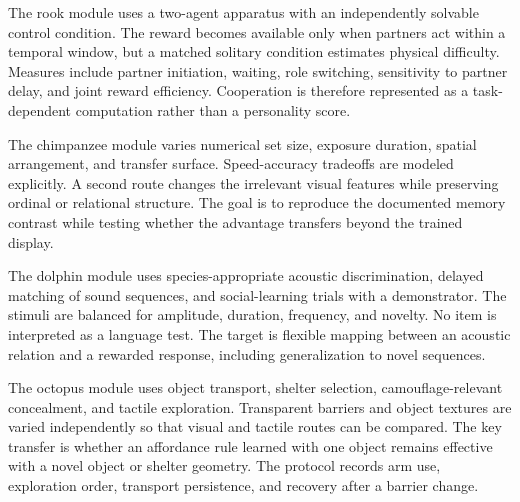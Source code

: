 \documentclass[conference]{IEEEtran}
\begin{document}
The rook module uses a two-agent apparatus with an independently solvable control condition. The reward becomes available only when partners act within a temporal window, but a matched solitary condition estimates physical difficulty. Measures include partner initiation, waiting, role switching, sensitivity to partner delay, and joint reward efficiency. Cooperation is therefore represented as a task-dependent computation rather than a personality score.

The chimpanzee module varies numerical set size, exposure duration, spatial arrangement, and transfer surface. Speed-accuracy tradeoffs are modeled explicitly. A second route changes the irrelevant visual features while preserving ordinal or relational structure. The goal is to reproduce the documented memory contrast while testing whether the advantage transfers beyond the trained display.

The dolphin module uses species-appropriate acoustic discrimination, delayed matching of sound sequences, and social-learning trials with a demonstrator. The stimuli are balanced for amplitude, duration, frequency, and novelty. No item is interpreted as a language test. The target is flexible mapping between an acoustic relation and a rewarded response, including generalization to novel sequences.

The octopus module uses object transport, shelter selection, camouflage-relevant concealment, and tactile exploration. Transparent barriers and object textures are varied independently so that visual and tactile routes can be compared. The key transfer is whether an affordance rule learned with one object remains effective with a novel object or shelter geometry. The protocol records arm use, exploration order, transport persistence, and recovery after a barrier change.
\end{document}
